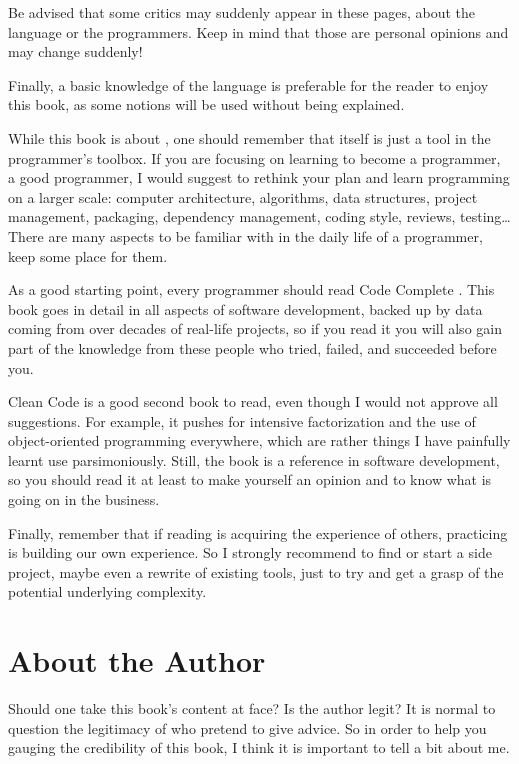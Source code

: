 Be advised that some critics may suddenly appear in these pages, about
the language or the programmers. Keep in mind that those are personal
opinions and may change suddenly!

Finally, a basic knowledge of the language is preferable for the
reader to enjoy this book, as some notions will be used without being
explained.

\bigskip

While this book is about \cpp, one should remember that \cpp{} itself
is just a tool in the programmer's toolbox. If you are focusing on
learning \cpp{} to become a programmer, a good programmer, I would
suggest to rethink your plan and learn programming on a larger scale:
computer architecture, algorithms, data structures, project
management, packaging, dependency management, coding style, reviews,
testing…  There are many aspects to be familiar with in the daily life
of a programmer, keep some place for them.

As a good starting point, every programmer should read Code Complete
\cite{code-complete}. This book goes in detail in all aspects of
software development, backed up by data coming from over decades of
real-life projects, so if you read it you will also gain part of the
knowledge from these people who tried, failed, and succeeded before
you.

Clean Code \cite{clean-code} is a good second book to read, even
though I would not approve all suggestions. For example, it pushes for
intensive factorization and the use of object-oriented programming
everywhere, which are rather things I have painfully learnt use
parsimoniously. Still, the book is a reference in software
development, so you should read it at least to make yourself an
opinion and to know what is going on in the business.

\bigskip

Finally, remember that if reading is acquiring the experience of
others, practicing is building our own experience. So I strongly
recommend to find or start a side project, maybe even a rewrite of
existing tools, just to try and get a grasp of the potential underlying
complexity.

\section{About the Author}

Should one take this book's content at face? Is the author legit? It
is normal to question the legitimacy of who pretend to give advice.
So in order to help you gauging the credibility of this book, I think
it is important to tell a bit about me.

